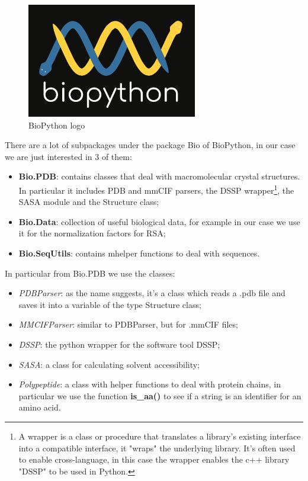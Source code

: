 \begin{figure}[h!]
    \centering
    \includegraphics{res/proteins_overview/biopython.png}
    \caption{BioPython logo}
\end{figure}

There are a lot of subpackages under the package Bio of BioPython, in our case we are just interested in 3 of them:
\begin{itemize}
    \item \textbf{Bio.PDB}: contains classes that deal with macromolecular crystal structures. In particular it includes PDB and mmCIF parsers, the DSSP wrapper\footnote{A wrapper is a class or procedure that translates a library's existing interface into a compatible interface, it "wraps" the underlying library. It's often used to enable cross-language, in this case the wrapper enables the c++ library "DSSP" to be used in Python.}, the SASA module and the Structure class;
    \item \textbf{Bio.Data}: collection of useful biological data, for example in our case we use it for the normalization factors for RSA;
    \item \textbf{Bio.SeqUtils}: contains mhelper functions to deal with sequences.
\end{itemize}

In particular from Bio.PDB we use the classes:
\begin{itemize}
    \item \textit{PDBParser}: as the name suggests, it's a class which reads a .pdb file and saves it into a variable of the type Structure class;
    \item \textit{MMCIFParser}: similar to PDBParser, but for .mmCIF files;
    \item \textit{DSSP}: the python wrapper for the software tool DSSP;
    \item \textit{SASA}: a class for calculating solvent accessibility;
    \item \textit{Polypeptide}: a class with helper functions to deal with protein chains, in particular we use the function \textbf{is\_aa()} to see if a string is an identifier for an amino acid.
\end{itemize}

